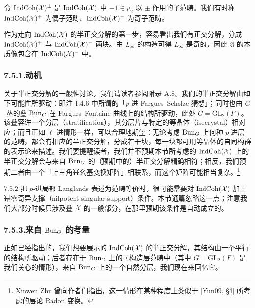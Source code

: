 令 $\operatorname{IndCoh}(\mathcal{X})^{\pm}$ 是 $\operatorname{IndCoh}(\mathcal{X})$ 中 $-1\in\mu_2$ 以 $\pm$ 作用的子范畴。我们有时称 $\operatorname{IndCoh}(\mathcal{X})^{+}$ 为偶子范畴、$\operatorname{IndCoh}(\mathcal{X})^{-}$ 为奇子范畴。

作为走向 $\operatorname{IndCoh}(\mathcal{X})$ 的半正交分解的第一步，容易看出我们有正交分解，分成 $\operatorname{IndCoh}(\mathcal{X})^{+}$ 与 $\operatorname{IndCoh}(\mathcal{X})^{-}$ 两块。由 $L_\infty$ 的构造可得 $L_\infty$ 是奇的，因此 $\mathfrak A$ 的本质像包含在 $\operatorname{IndCoh}(\mathcal{X})^{-}$ 中。

\subsubsection*{7.5.1.\quad 动机}
关于半正交分解的一般性讨论，我们请读者参阅附录 A.8。我们的半正交分解由如下可能性所驱动：即注 1.4.6 中所谓的「$p$-进 Fargues--Scholze 猜想」；同时也由 $G$-丛的叠 $\operatorname{Bun}_G$ 在 Fargues--Fontaine 曲线上的结构所驱动，此处 $G=\mathrm{GL}_2(F)$。该叠容许一个分层（stratification），其分层片与特定的等晶体（isocrystal）相对应；而且正如 $\ell$-进情形一样，可以合理地期望：无论考虑 $\operatorname{Bun}_G$ 上何种 $p$-进层的范畴，都会有相应的半正交分解，分成若干块，每一块都可用等晶体的自同构群的表示论来描述。我们要提醒读者，我们并不预期本节所考虑的 $\operatorname{IndCoh}(\mathcal{X})$ 上的半正交分解会与来自 $\operatorname{Bun}_G$ 的（预期中的）半正交分解精确相符；相反，我们预期二者由一个「上三角幂幺基变换矩阵」相联系，而这个矩阵可能相当复杂。\footnote{Xinwen Zhu 曾向作者们指出，这一情形在某种程度上类似于 [Yun09, §4] 所考虑的层论 Radon 变换。}

\begin{rem}{7.5.2}\label{thm:a4-7-5-2}
把 $p$-进局部 Langlands 表述为范畴等价时，很可能需要对 $\operatorname{IndCoh}(\mathcal{X})$ 加上幂零奇异支撑（nilpotent singular support）条件。本节通篇忽略这一点；注意我们大部分时候只涉及叠 $\mathcal{X}$ 的一般部分，在那里预期该条件是自动成立的。
\end{rem}

\subsubsection*{7.5.3.\quad 来自 $\operatorname{Bun}_G$ 的考量}
正如已经指出的，我们想要展示的 $\operatorname{IndCoh}(\mathcal{X})$ 的半正交分解，其结构由一个平行的结构所驱动；后者存在于 $\operatorname{Bun}_G$ 上的可构造层范畴中（其中 $G=\mathrm{GL}_2(F)$ 是我们关心的情形），来自 $\operatorname{Bun}_G$ 上的一个自然分层，我们现在来回忆它。

